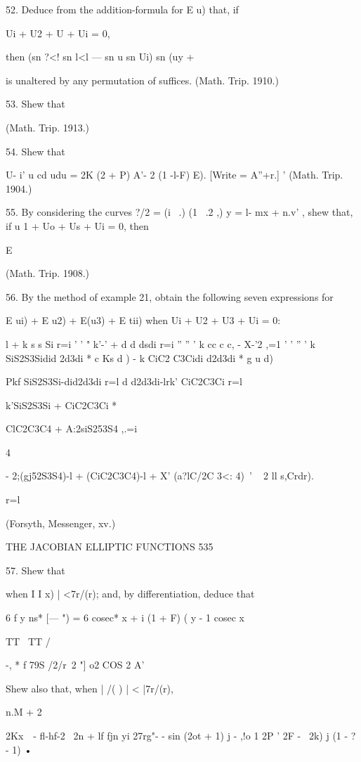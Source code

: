 52. Deduce from the addition-formula for E u) that, if

Ui + U2 + U + Ui = 0,

then (sn ?<! sn l<l — sn u sn Ui) sn (uy + %

is unaltered by any permutation of suffices. (Math. Trip. 1910.)

53. Shew that

(Math. Trip. 1913.)

54. Shew that

U- i' u cd udu = 2K (2 + P) A'- 2 (1 -l-F) E). [Write = A''+r.] '
(Math. Trip. 1904.)

55. By considering the curves ?/2 = (i \ .) (1 \ .2 ,) y = l- mx +
n.v' , shew that, if u 1 + Uo + Us + Ui = 0, then

E %

(Math. Trip. 1908.)

56. By the method of example 21, obtain the following seven
expressions for

E ui) + E u2) + E(u3) + E tii) when Ui + U2 + U3 + Ui = 0:

l + k s s Si r=i ' ' " k'-' + d d dsdi r=i '' '' ' k cc c c, - X-'2
,=1 ' ' '' ' k SiS2S3Sidid 2d3di * c Ks d ) - k CiC2 C3Cidi d2d3di * g
u d)

Pkf SiS2S3Si-did2d3di r=l d d2d3di-lrk' CiC2C3Ci r=l

k'SiS2S3Si + CiC2C3Ci *

ClC2C3C4 + A:2siS253S4 ,.=i

4

- 2;(gj52S3S4)-l + (CiC2C3C4)-l + X' (a?lC/2C 3<: 4)~' ~ 2 ll s,Crdr).

r=l

(Forsyth, Messenger, xv.)

THE JACOBIAN ELLIPTIC FUNCTIONS 535

57. Shew that

when I I x) | <7r/(r); and, by differentiation, deduce that

6 f y ns* [— ") = 6 cosec* x + i (1 + F) ( y - 1 cosec x

TT \ TT /

 -, * f 79S /2/r\ 2 "] o2 COS 2 A'

Shew also that, when | /( ) | < |7r/(r),

n.M + 2

2Kx\ \ - fl-hf-2 \ 2n + lf fjn yi 27rg"- - sin (2ot + 1) j - ,!o 1 2P
' 2F - \ 2k) j (1 - ? - 1) •

